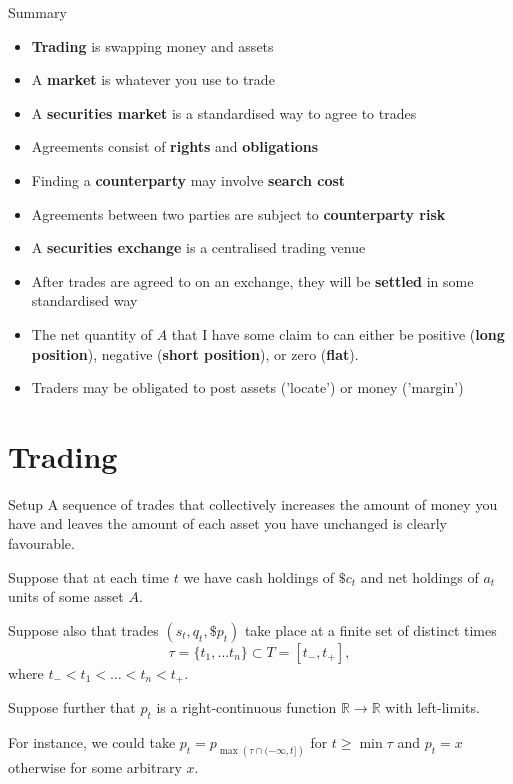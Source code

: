 \documentclass{beamer}
\begin{document}
\begin{frame}{Summary}
	\begin{itemize}
		\item \textbf{Trading} is swapping money and assets
		\item A \textbf{market} is whatever you use to trade
		\item A \textbf{securities market} is a standardised way to agree to trades
		\item Agreements consist of \textbf{rights} and \textbf{obligations}
		\item Finding a \textbf{counterparty} may involve \textbf{search cost}
		\item Agreements between two parties are subject to \textbf{counterparty risk}
		\item A \textbf{securities exchange} is a centralised trading venue %
		\item After trades are agreed to on an exchange, they will be \textbf{settled} in some standardised way
		\item The net quantity of $A$ that I have some claim to can either be positive (\textbf{long position}), negative (\textbf{short position}), or zero (\textbf{flat}).
		\item Traders may be obligated to post assets ('locate') or money ('margin')
	\end{itemize}
\end{frame}

\section{Trading}
\begin{frame}{Setup}
	A sequence of trades that collectively increases the amount of money you have and leaves the amount of each asset you have unchanged is clearly favourable.

	\pause

	Suppose that at each time $t$ we have cash holdings of $\$c_t$ and net holdings of $a_t$ units of some asset $A$.

	Suppose also that trades $(s_t, q_t, \$p_t)$ take place at a finite set of distinct times
	$$\tau = \{t_1,\ldots t_n\}\subset T = [t_-, t_+],$$
	where $t_-<t_1<\ldots<t_n<t_+$.

	\pause

	Suppose further that $p_t$ is a right-continuous function $\mathbb R\to\mathbb R$ with left-limits.

	For instance, we could take $p_t = p_{\max \left(\tau\cap (-\infty,t]\right)}$ for $t\geq \min\tau$ and $p_t=x$ otherwise for some arbitrary $x$. %

\end{frame}
\end{document}

